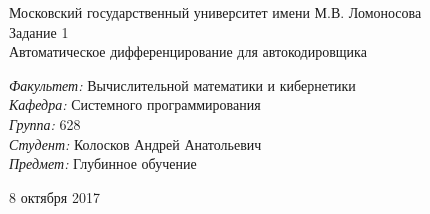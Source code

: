 \documentclass[oneside,final,12pt]{extreport}
\author{Колосков Андрей Анатольевич}
\begin{document}
\begin{titlepage}
\begin{center}
\Large Московский государственный университет имени М.В. Ломоносова \\[5cm]
\huge Задание 1 \\[0.5cm]
\Large Автоматическое дифференцирование для автокодировщика \\[5cm]
\begin{flushright}
\begin{minipage}{0.8\textwidth}
\normalsize\emph{Факультет:} Вычислительной математики и кибернетики \\
\emph{Кафедра:} Системного программирования \\
\emph{Группа:} 628 \\
\emph{Студент:} Колосков Андрей Анатольевич \\
\emph{Предмет:} Глубинное обучение \\[5cm]
\end{minipage}
\end{flushright}
\large 8 октября 2017
\end{center}
\end{titlepage}
\newpage
\end{document}
